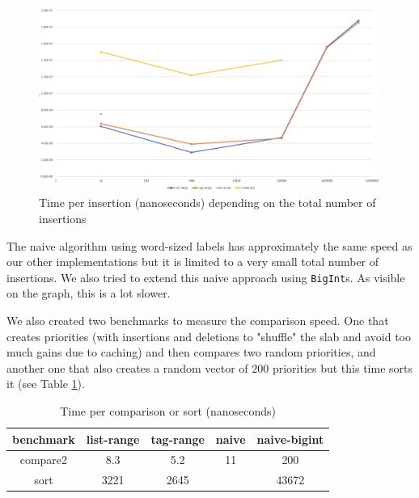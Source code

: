 \documentclass[12pt]{article}
\begin{document}
\begin{figure}[h!]
    \includegraphics[width=450px, keepaspectratio]{./insert.png}
    \caption{Time per insertion (nanoseconds) depending on the total number of insertions}
    \label{graph:insert}
\end{figure}

The naive algorithm using word-sized labels has approximately the same speed as our other implementations but it is limited to a very small total number of insertions. We also tried to extend this naive approach using \texttt{BigInt}s. As visible on the graph, this is a lot slower.

We also created two benchmarks to measure the comparison speed. One that creates priorities (with insertions and deletions to "shuffle" the slab and avoid too much gains due to caching) and then compares two random priorities, and another one that also creates a random vector of $200$ priorities but this time sorts it (see Table \ref{table:comparison}).

\begin{table}[h!]
    \begin{center}
        \begin{tabular}{|c | c c c c|}
            \hline
            benchmark & list-range & tag-range & naive & naive-bigint \\ [0.5ex]
            \hline
            compare2  & 8.3        & 5.2       & 11    & 200          \\
            \hline
            sort      & 3221       & 2645      &       & 43672        \\
            \hline
        \end{tabular}

        \caption{Time per comparison or sort (nanoseconds)}
        \label{table:comparison}

    \end{center}
\end{table}
\end{document}
